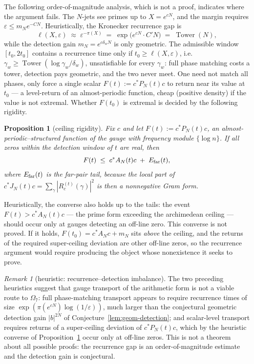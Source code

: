 \documentclass[11pt]{amsart}
\newtheorem{proposition}[theorem]{Proposition}
\theoremstyle{definition}
\theoremstyle{remark}
\newtheorem{remark}[theorem]{Remark}
\theoremstyle{definition}
\begin{document}
The following order-of-magnitude analysis, which is not a proof, indicates where the argument
fails.  The $N$-jets see primes up to $X=e^{cN}$, and the margin
requires $\varepsilon\le m_Ne^{-CN}$.  Heuristically, the Kronecker recurrence gap is
\[
   \ell(X,\varepsilon)\;\approx\;\varepsilon^{-\pi(X)}\;=\;\exp\!\bigl(e^{cN}\cdot C'N\bigr)\;=\;
   \operatorname{Tower}(N),
\]
while the detection gain $m_N=e^{c\delta_wN}$ is only geometric.  The admissible window $[t_0,2t_0]$
contains a recurrence time only if $t_0\ge\ell(X,\varepsilon)$, i.e.\ $\gamma_w\ge
\operatorname{Tower}(\log\gamma_w/\delta_w)$, unsatisfiable for every $\gamma_w$: full phase matching
costs a tower, detection pays geometric, and the two never meet.  One need not match all phases, only
force a single scalar $F(t):=c^*P_N(t)c$ to return near its value at $t_0$ --- a level-return of an
almost-periodic function, cheap (positive density) if the value is not extremal.  Whether $F(t_0)$ is
extremal is decided by the following rigidity.

\begin{proposition}[ceiling rigidity]\label{prop:ceiling}
Fix $c$ and let $F(t):=c^*P_N(t)c$, an almost-periodic--structured function of the gauge with frequency
module $\{\log n\}$.  If all zeros within the detection window of $t$ are real, then
\[
   F(t)\;\le\;c^*A_N(t)c\;+\;E_{\rm far}(t),
\]
where $E_{\rm far}(t)$ is the far-pair tail, because the local part of
$c^*J_N(t)c=\sum_\gamma|R_c^{(t)}(\gamma)|^2$ is then a nonnegative Gram form.
\end{proposition}

\noindent Heuristically, the converse also holds up to the tails: the event $F(t)>c^*A_N(t)c$ --- the
prime form exceeding the archimedean ceiling --- should occur only at gauges detecting an off-line
zero.  This converse is not proved.  If it holds, $F(t_0)=c^*A_Nc+m_N$ sits \emph{above} the ceiling,
and the returns of the required super-ceiling deviation are other off-line zeros, so the recurrence
argument would require producing the object whose nonexistence it seeks to prove.

\begin{remark}[heuristic: recurrence--detection imbalance]\label{thm:W4}
The two preceding heuristics suggest that gauge transport of the arithmetic form is not a viable route
to $\Omega_7$: full phase-matching transport appears to require recurrence times of size
$\exp(\pi(e^{cN})\log(1/\varepsilon))$, much larger than the conjectural geometric detection gain
$|b|^{2N}$ of Conjecture~\ref{lem:geom-detection}; and scalar-level transport requires returns of a
super-ceiling deviation of $c^*P_N(t)c$, which by the heuristic converse of
Proposition~\ref{prop:ceiling} occur only at off-line zeros.  This is not a theorem about all
possible proofs: the recurrence gap is an order-of-magnitude estimate and the detection gain is
conjectural.
\end{remark}
\end{document}
